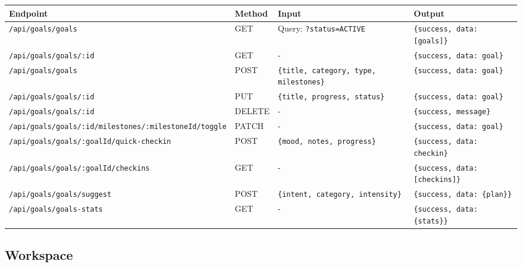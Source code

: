 \documentclass[11pt,a4paper]{article}
\begin{document}
\begin{longtable}{|p{3cm}|p{2cm}|p{4cm}|p{6cm}|}
\hline
\textbf{Endpoint} & \textbf{Method} & \textbf{Input} & \textbf{Output} \\
\hline
\endhead
\hline
\endfoot
\hline
\endlastfoot
\texttt{/api/goals/goals} & GET & Query: \texttt{?status=ACTIVE} & \texttt{\{success, data: [goals]\}} \\
\texttt{/api/goals/goals/:id} & GET & - & \texttt{\{success, data: goal\}} \\
\texttt{/api/goals/goals} & POST & \texttt{\{title, category, type, milestones\}} & \texttt{\{success, data: goal\}} \\
\texttt{/api/goals/goals/:id} & PUT & \texttt{\{title, progress, status\}} & \texttt{\{success, data: goal\}} \\
\texttt{/api/goals/goals/:id} & DELETE & - & \texttt{\{success, message\}} \\
\texttt{/api/goals/goals/:id/milestones/:milestoneId/toggle} & PATCH & - & \texttt{\{success, data: goal\}} \\
\texttt{/api/goals/goals/:goalId/quick-checkin} & POST & \texttt{\{mood, notes, progress\}} & \texttt{\{success, data: checkin\}} \\
\texttt{/api/goals/goals/:goalId/checkins} & GET & - & \texttt{\{success, data: [checkins]\}} \\
\texttt{/api/goals/goals/suggest} & POST & \texttt{\{intent, category, intensity\}} & \texttt{\{success, data: \{plan\}\}} \\
\texttt{/api/goals/goals-stats} & GET & - & \texttt{\{success, data: \{stats\}\}} \\
\hline
\end{longtable}

\subsection{Workspace}
\end{document}
